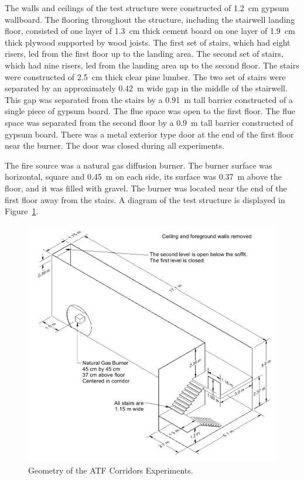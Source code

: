 The walls and ceilings of the test structure were constructed of 1.2~cm gypsum wallboard. The flooring throughout the structure, including the stairwell landing floor, consisted of one layer of 1.3~cm thick cement board on one layer of 1.9~cm thick plywood supported by wood joists. The first set of stairs, which had eight risers, led from the first floor up to the landing area. The second set of stairs, which had nine risers, led from the landing area up to the second floor. The stairs were constructed of 2.5~cm thick clear pine lumber. The two set of stairs were separated by an approximately 0.42~m wide gap in the middle of the stairwell. This gap was separated from the stairs by a 0.91~m tall barrier constructed of a single piece of gypsum board. The flue space was open to the first floor.  The flue space was separated from the second floor by a 0.9~m tall barrier constructed of gypsum board. There was a metal exterior type door at the end of the first floor near the burner.  The door was closed during all experiments.

The fire source was a natural gas diffusion burner.  The burner surface was horizontal, square and 0.45~m on each side, its surface was 0.37~m above the floor, and it was filled with gravel. The burner was located near the end of the first floor away from the stairs. A diagram of the test structure is displayed in Figure~\ref{ATF Drawing}.

\begin{figure}[p]
\includegraphics[width=\textwidth]{FIGURES/ATF_Corridors/ATF_Corridors_Drawing}
\caption{Geometry of the ATF Corridors Experiments.}
\label{ATF Drawing}
\end{figure}


